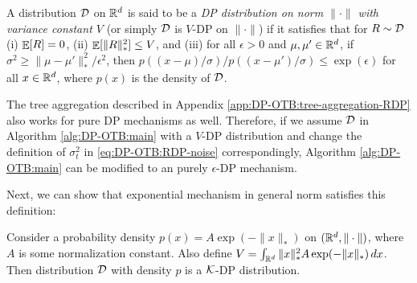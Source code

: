\newcommand{\DPnorm}{\text{$(K,\calD)$-DP-able}}
\begin{definition}[$V$-DP distribution]
\label{def:DP-OTB:DP-dist}
A distribution ${\cal D}$ on $\mathbb R^d$ is said to be a \textit{DP distribution on norm $\|\cdot\|$ with variance constant $V$} (or simply ${\cal D}$ is $V$-DP on $\|\cdot\|$) if it satisfies that for $R\sim{\cal D}$ (i) $\mathop{\mathbb{E}}[R]=0$, (ii) $\mathop{\mathbb{E}}[\|R\|_*^2]\leq V$, and (iii) for all $\epsilon>0$ and $\mu,\mu'\in\mathbb R^d$, if $\sigma^2\geq \|\mu-\mu'\|_*^2/\epsilon^2$, then $p((x-\mu)/\sigma)/p((x-\mu')/\sigma) \leq \exp(\epsilon)$ for all $x\in\mathbb R^d$, where $p(x)$ is the density of ${\cal D}$.
\end{definition}

The tree aggregation described in Appendix \ref{app:DP-OTB:tree-aggregation-RDP} also works for pure DP mechanisms as well. Therefore, if we assume ${\cal D}$ in Algorithm \ref{alg:DP-OTB:main} with a $V$-DP distribution and change the definition of $\sigma_t^2$ in \eqref{eq:DP-OTB:RDP-noise} correspondingly, Algorithm \ref{alg:DP-OTB:main} can be modified to an purely $\epsilon$-DP mechanism.

Next, we can show that exponential mechanism in general norm satisfies this definition:

\begin{lemma}
\label{thm:DP-OTB:exponential-mechanism-general-norm}
Consider a probability density $p(x) = A\exp(-\|x\|_*)$ on $(\mathbb R^d,\|\cdot\|)$, where $A$ is some normalization constant. Also define $V=\int_{\mathbb R^d} \|x\|_*^2 A\exp(-\|x\|_*)\, dx$. Then distribution ${\cal D}$ with density $p$ is a ${\cal K}$-DP distribution.
\end{lemma}

